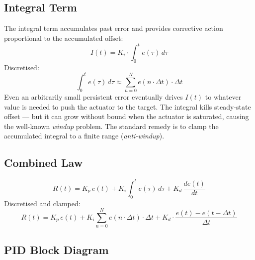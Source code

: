 \documentclass[12pt]{article}
\begin{document}
\subsection{Integral Term}

The integral term accumulates past error and provides corrective action proportional to the accumulated offset:
\begin{equation}
I(t) = K_i \cdot \int_0^t e(\tau)\,d\tau
\label{eq:i}
\end{equation}
Discretised:
\begin{equation}
\int_0^t e(\tau)\,d\tau \approx \sum_{n=0}^{N} e(n \cdot \Delta t) \cdot \Delta t
\label{eq:i_disc}
\end{equation}
Even an arbitrarily small persistent error eventually drives $I(t)$ to whatever value is needed to push the actuator to the target. The integral kills steady-state offset --- but it can grow without bound when the actuator is saturated, causing the well-known \emph{windup} problem. The standard remedy is to clamp the accumulated integral to a finite range (\emph{anti-windup}).

\subsection{Combined Law}

\begin{equation}
R(t) = K_p\,e(t) + K_i \int_0^t e(\tau)\,d\tau + K_d\,\frac{de(t)}{dt}
\label{eq:pid}
\end{equation}
Discretised and clamped:
\begin{equation}
R(t) = K_p\,e(t) + K_i \sum_{n=0}^{N} e(n \cdot \Delta t) \cdot \Delta t + K_d \cdot \frac{e(t) - e(t-\Delta t)}{\Delta t}
\label{eq:pid_disc}
\end{equation}

\subsection{PID Block Diagram}
\end{document}

